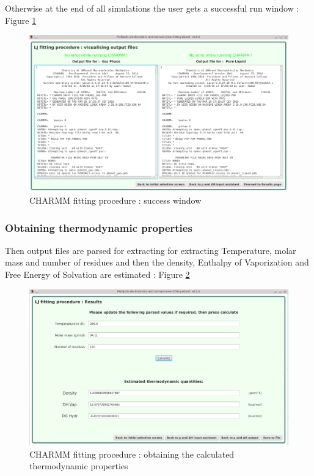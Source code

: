 \documentclass[12pt,a4paper]{article}
\begin{document}
Otherwise at the end of all simulations the user gets a successful run window : Figure \ref{fig7}\\

\begin{figure}[h!]
\centering
\includegraphics[width=0.9\linewidth]{pics/scr7}
\caption{CHARMM fitting procedure : success window}
\label{fig7}
\end{figure}

\subsubsection{Obtaining thermodynamic properties}

Then output files are parsed for extracting for extracting Temperature, molar mass and number of 
residues and then the density, Enthalpy of Vaporization and Free Energy of Solvation are estimated 
: Figure \ref{fig8}\\

\begin{figure}[h!]
\centering
\includegraphics[width=0.9\linewidth]{pics/scr8}
\caption{CHARMM fitting procedure : obtaining the calculated thermodynamic properties}
\label{fig8}
\end{figure}
\end{document}
